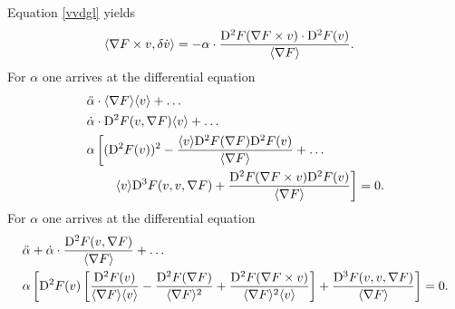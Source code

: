 Equation \eqref{vvdgl} yields
\begin{align}
    \langle  \nabla F  \times v ,  \delta \dot{ v }  \rangle  &=
    -\alpha \cdot \frac{ \mathrm{D}^{ 2 } F ( \nabla F  \times v ) \cdot \mathrm{D}^{ 2 } F ( v ) }{ \langle  \nabla F   \rangle } .
\end{align}
For $ \alpha $ one arrives at the differential equation
\begin{align}
    &\ddot{ \alpha } \cdot \langle  \nabla F   \rangle \langle  v  \rangle  +  \dots\nonumber\\
    &\dot{ \alpha } \cdot \mathrm{D}^{ 2 } F ( v, \nabla F  ) \langle  v  \rangle  +  \dots\nonumber\\
    &\alpha \left[ ( \mathrm{D}^{ 2 } F ( v ) )^2  -
    \frac{ \langle  v  \rangle \mathrm{D}^{ 2 } F ( \nabla F  ) \mathrm{D}^{ 2 } F ( v ) }{ \langle  \nabla F   \rangle }  +  \dots\right.\nonumber\\
    &\qquad\left.\langle  v  \rangle \mathrm{D}^{ 3 } F ( v, v, \nabla F  )  +
    \frac{ \mathrm{D}^{ 2 } F ( \nabla F  \times v ) \mathrm{D}^{ 2 } F ( v ) }{ \langle  \nabla F   \rangle } \right]  =  0 .
\end{align}
For $ \alpha $ one arrives at the differential equation
\begin{align}
    &\ddot{ \alpha }  +  \dot{ \alpha } \cdot \frac{ \mathrm{D}^{ 2 } F ( v, \nabla F  ) }{ \langle  \nabla F   \rangle }  +  \dots\nonumber\\
    &\alpha \left[ \mathrm{D}^{ 2 } F ( v ) \left[ \frac{ \mathrm{D}^{ 2 } F ( v ) }{ \langle  \nabla F   \rangle \langle  v  \rangle }  -
    \frac{ \mathrm{D}^{ 2 } F ( \nabla F  ) }{ \langle  \nabla F   \rangle^2 }  +
    \frac{ \mathrm{D}^{ 2 } F ( \nabla F  \times v ) }{ \langle  \nabla F   \rangle^2 \langle  v  \rangle } \right]  +
    \frac{ \mathrm{D}^{ 3 } F ( v, v, \nabla F  ) }{ \langle  \nabla F   \rangle } \right]  =  0 .
\end{align}